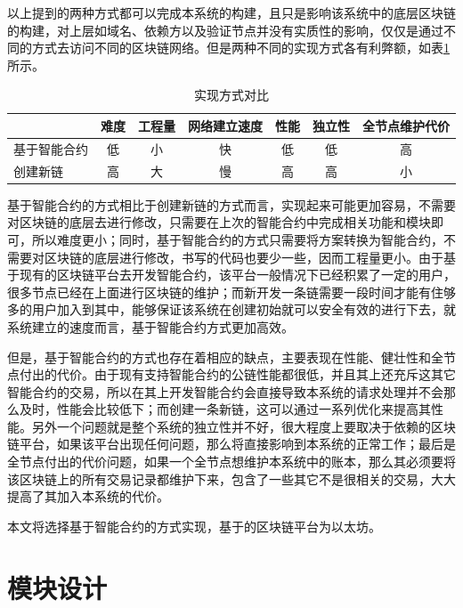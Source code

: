 以上提到的两种方式都可以完成本系统的构建，且只是影响该系统中的底层区块链的构建，对上层如域名、依赖方以及验证节点并没有实质性的影响，仅仅是通过不同的方式去访问不同的区块链网络。但是两种不同的实现方式各有利弊额，如表\ref{cmpMethod}所示。

\begin{table}[h] %
\caption{实现方式对比}\label{cmpMethod} %
\begin{tabular}{l*{6}{c}} %
\hline  
\hline  
  & 难度 & 工程量 & 网络建立速度 & 性能 & 独立性 & 全节点维护代价 \\ %
\hline %
基于智能合约 & 低 & 小 & 快 & 低 & 低 & 高 \\
\hline  
创建新链 & 高 & 大 & 慢 & 高 & 高 & 小 \\
 
\hline  
\hline  
\end{tabular}  
\end{table}  

基于智能合约的方式相比于创建新链的方式而言，实现起来可能更加容易，不需要对区块链的底层去进行修改，只需要在上次的智能合约中完成相关功能和模块即可，所以难度更小；同时，基于智能合约的方式只需要将方案转换为智能合约，不需要对区块链的底层进行修改，书写的代码也要少一些，因而工程量更小。由于基于现有的区块链平台去开发智能合约，该平台一般情况下已经积累了一定的用户，很多节点已经在上面进行区块链的维护；而新开发一条链需要一段时间才能有住够多的用户加入到其中，能够保证该系统在创建初始就可以安全有效的进行下去，就系统建立的速度而言，基于智能合约方式更加高效。

但是，基于智能合约的方式也存在着相应的缺点，主要表现在性能、健壮性和全节点付出的代价。由于现有支持智能合约的公链性能都很低，并且其上还充斥这其它智能合约的交易，所以在其上开发智能合约会直接导致本系统的请求处理并不会那么及时，性能会比较低下；而创建一条新链，这可以通过一系列优化来提高其性能。另外一个问题就是整个系统的独立性并不好，很大程度上要取决于依赖的区块链平台，如果该平台出现任何问题，那么将直接影响到本系统的正常工作；最后是全节点付出的代价问题，如果一个全节点想维护本系统中的账本，那么其必须要将该区块链上的所有交易记录都维护下来，包含了一些其它不是很相关的交易，大大提高了其加入本系统的代价。

本文将选择基于智能合约的方式实现，基于的区块链平台为以太坊。



\section{模块设计}



